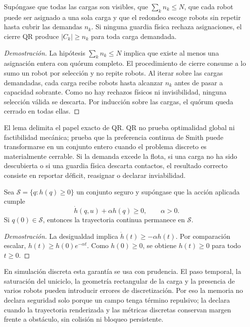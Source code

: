 \begin{lema}
Supóngase que todas las cargas son visibles, que $\sum_k n_k\leq N$, que cada robot puede
ser asignado a una sola carga y que el redondeo escoge robots sin repetir hasta cubrir las
demandas $n_k$. Si ninguna guardia física rechaza asignaciones, el cierre QR produce
$|C_k|\geq n_k$ para toda carga demandada.
\end{lema}

\begin{proof}[Demostración]
La hipótesis $\sum_k n_k\leq N$ implica que existe al menos una asignación entera con
quórum completo. El procedimiento de cierre consume a lo sumo un robot por selección y
no repite robots. Al iterar sobre las cargas demandadas, cada carga recibe robots hasta
alcanzar $n_k$ antes de pasar a capacidad sobrante. Como no hay rechazos físicos ni
invisibilidad, ninguna selección válida se descarta. Por inducción sobre las cargas, el
quórum queda cerrado en todas ellas.
\end{proof}

El lema delimita el papel exacto de QR. QR no prueba optimalidad global ni factibilidad
mecánica; prueba que la preferencia continua de Smith puede transformarse en un conjunto
entero cuando el problema discreto es materialmente cerrable. Si la demanda excede la
flota, si una carga no ha sido descubierta o si una guardia física descarta contactos, el
resultado correcto consiste en reportar déficit, reasignar o declarar inviabilidad.

\begin{proposicion}
Sea $\mathcal S=\{q:h(q)\geq0\}$ un conjunto seguro y supóngase que la acción aplicada
cumple
\[
  \dot h(q,u)+\alpha h(q)\geq0,\qquad \alpha>0 .
\]
Si $q(0)\in\mathcal S$, entonces la trayectoria continua permanece en $\mathcal S$.
\end{proposicion}

\begin{proof}[Demostración]
La desigualdad implica $\dot h(t)\geq-\alpha h(t)$. Por comparación escalar,
$h(t)\geq h(0)e^{-\alpha t}$. Como $h(0)\geq0$, se obtiene $h(t)\geq0$ para todo
$t\geq0$.
\end{proof}

En simulación discreta esta garantía se usa con prudencia. El paso temporal, la saturación
del uniciclo, la geometría rectangular de la carga y la presencia de varios robots pueden
introducir errores de discretización. Por eso la memoria no declara seguridad solo porque
un campo tenga término repulsivo; la declara cuando la trayectoria renderizada y las
métricas discretas conservan margen frente a obstáculo, sin colisión ni bloqueo persistente.


